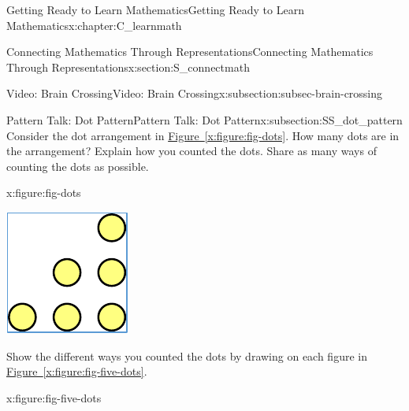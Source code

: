 \documentclass[oneside,10pt,]{book}
\newcommand{\xreffont}{\relax}
\numberwithin{equation}{chapter}
\begin{document}
\begin{chapterptx}{Getting Ready to Learn Mathematics}{}{Getting Ready to Learn Mathematics}{}{}{x:chapter:C_learnmath}
\begin{sectionptx}{Connecting Mathematics Through Representations}{}{Connecting Mathematics Through Representations}{}{}{x:section:S_connectmath}
\begin{subsectionptx}{Video: Brain Crossing}{}{Video: Brain Crossing}{}{}{x:subsection:subsec-brain-crossing}
\end{subsectionptx}
%
%
\typeout{************************************************}
\typeout{************************************************}
%
\begin{subsectionptx}{Pattern Talk: Dot Pattern}{}{Pattern Talk: Dot Pattern}{}{}{x:subsection:SS_dot_pattern}
Consider the dot arrangement in \hyperref[x:figure:fig-dots]{Figure~{\xreffont\ref{x:figure:fig-dots}}}. How many dots are in the arrangement? Explain how you counted the dots. Share as many ways of counting the dots as possible.%
\begin{figureptx}{}{x:figure:fig-dots}{}%
\begin{image}{0.4}{0.2}{0.4}%
\includegraphics[width=\linewidth]{external/tri-dots.pdf}
\end{image}%
\tcblower
\end{figureptx}%
Show the different ways you counted the dots by drawing on each figure in \hyperref[x:figure:fig-five-dots]{Figure~{\xreffont\ref{x:figure:fig-five-dots}}}.%
\begin{figureptx}{}{x:figure:fig-five-dots}{}%
\begin{sidebyside}{5}{0.015}{0.015}{0.03}%
\begin{sbspanel}{0.17}%

\end{sbspanel}
\end{sidebyside}
\end{figureptx}
\end{subsectionptx}
\end{sectionptx}
\end{chapterptx}
\end{document}
